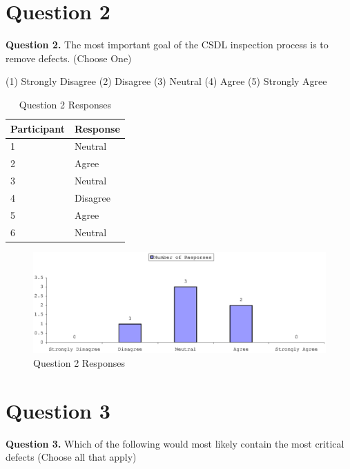 \clearpage
\section{Question 2}
\label{appendix:section:question2}
\noindent \textbf{Question 2.} The most important goal of the CSDL
inspection process is to remove defects. (Choose One)

(1) Strongly Disagree (2) Disagree (3) Neutral (4) Agree (5) Strongly Agree

\begin{table}[!h]
  \begin{center}
    \caption{Question 2 Responses}
    \label{tab:pre-selection-questionnaire-results-2}
    \begin{tabular}{|p{5.0cm}|p{8.0cm}|} \hline
{\bf Participant} & {\bf Response} \\ \hline
1 & Neutral \\ \hline
2 & Agree \\ \hline
3 & Neutral \\ \hline
4 & Disagree \\ \hline
5 & Agree \\ \hline
6 & Neutral \\ \hline
    \end{tabular}
  \end{center}
\end{table}

\begin{figure}[htb]
  \centering
  \includegraphics[width=1.0\textwidth]{figs/Results/pre-selection-questionnaire-2.eps}
  \caption{Question 2 Responses}
  \label{fig:pre-selection-questionnaire-results-2}
\end{figure}


\clearpage
\section{Question 3}
\label{appendix:section:question3}
\noindent \textbf{Question 3.} Which of the following would most likely
contain the most critical defects (Choose all that apply)

